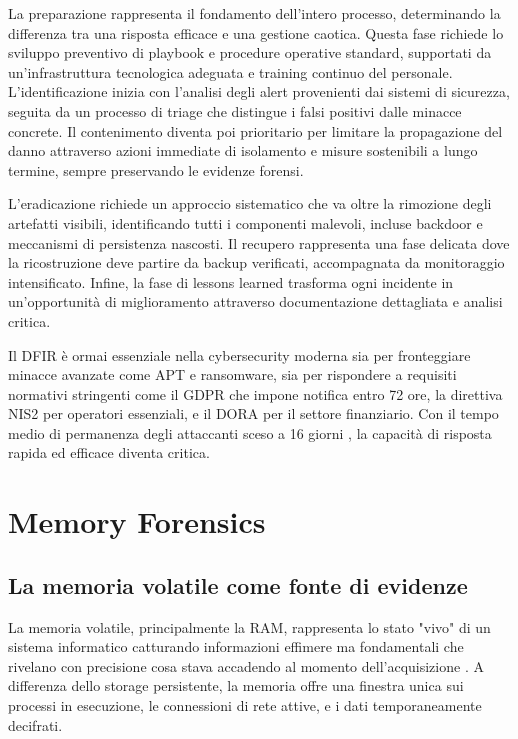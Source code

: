 La preparazione rappresenta il fondamento dell'intero processo, determinando la differenza tra una risposta efficace e una gestione caotica. Questa fase richiede lo sviluppo preventivo di playbook e procedure operative standard, supportati da un'infrastruttura tecnologica adeguata e training continuo del personale. L'identificazione inizia con l'analisi degli alert provenienti dai sistemi di sicurezza, seguita da un processo di triage che distingue i falsi positivi dalle minacce concrete. Il contenimento diventa poi prioritario per limitare la propagazione del danno attraverso azioni immediate di isolamento e misure sostenibili a lungo termine, sempre preservando le evidenze forensi.

L'eradicazione richiede un approccio sistematico che va oltre la rimozione degli artefatti visibili, identificando tutti i componenti malevoli, incluse backdoor e meccanismi di persistenza nascosti. Il recupero rappresenta una fase delicata dove la ricostruzione deve partire da backup verificati, accompagnata da monitoraggio intensificato. Infine, la fase di lessons learned trasforma ogni incidente in un'opportunità di miglioramento attraverso documentazione dettagliata e analisi critica.

Il DFIR è ormai essenziale nella cybersecurity moderna sia per fronteggiare minacce avanzate come APT e ransomware, sia per rispondere a requisiti normativi stringenti come il GDPR \cite{gdpr2016} che impone notifica entro 72 ore, la direttiva NIS2 \cite{nis2_2022} per operatori essenziali, e il DORA \cite{dora2022} per il settore finanziario. Con il tempo medio di permanenza degli attaccanti sceso a 16 giorni \cite{mandiant2023}, la capacità di risposta rapida ed efficace diventa critica.

\section{Memory Forensics}

\subsection{La memoria volatile come fonte di evidenze}

La memoria volatile, principalmente la RAM, rappresenta lo stato "vivo" di un sistema informatico catturando informazioni effimere ma fondamentali che rivelano con precisione cosa stava accadendo al momento dell'acquisizione \cite{ligh2014}. A differenza dello storage persistente, la memoria offre una finestra unica sui processi in esecuzione, le connessioni di rete attive, e i dati temporaneamente decifrati.

